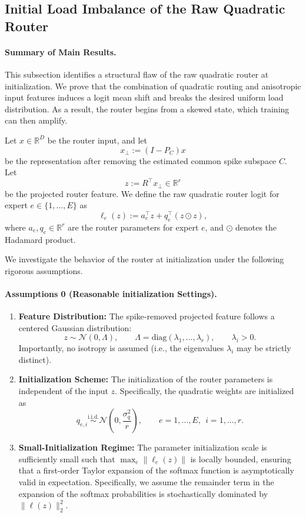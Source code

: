 \documentclass[11pt]{article}
\begin{document}
\subsection{Initial Load Imbalance of the Raw Quadratic Router}

\paragraph{Summary of Main Results.}
This subsection identifies a structural flaw of the raw quadratic router at initialization. We prove that the combination of quadratic routing and anisotropic input features induces a logit mean shift and breaks the desired uniform load distribution. As a result, the router begins from a skewed state, which training can then amplify.

Let $x \in \mathbb{R}^D$ be the router input, and let
$$x_\perp := (I-P_C)x$$
be the representation after removing the estimated common spike subspace $C$.
Let
$$z := R^\top x_\perp \in \mathbb{R}^r$$
be the projected router feature. We define the raw quadratic router logit for expert $e \in \{1,\dots,E\}$ as
$$\ell_e(z) := a_e^\top z + q_e^\top (z \odot z),$$
where $a_e, q_e \in \mathbb{R}^r$ are the router parameters for expert $e$, and $\odot$ denotes the Hadamard product.

We investigate the behavior of the router at initialization under the following rigorous assumptions.

\paragraph{Assumptions 0 (Reasonable initialization Settings).}
\begin{enumerate}
    \item[(A1)] \textbf{Feature Distribution:} The spike-removed projected feature follows a centered Gaussian distribution:
    $$z \sim \mathcal{N}(0,\Lambda), \qquad \Lambda = \mathrm{diag}(\lambda_1,\dots,\lambda_r), \qquad \lambda_i>0.$$
    Importantly, no isotropy is assumed (i.e., the eigenvalues $\lambda_i$ may be strictly distinct).

    \item[(A2)] \textbf{Initialization Scheme:} The initialization of the router parameters is independent of the input $z$. Specifically, the quadratic weights are initialized as
    $$q_{e,i} \overset{\mathrm{i.i.d.}}{\sim} \mathcal{N}\!\left(0,\frac{\sigma_q^2}{r}\right), \qquad e=1,\dots,E,\ \ i=1,\dots,r.$$

    \item[(A3)] \textbf{Small-Initialization Regime:} The parameter initialization scale is sufficiently small such that $\max_{e} \|\ell_e(z)\|$ is locally bounded, ensuring that a first-order Taylor expansion of the softmax function is asymptotically valid in expectation. Specifically, we assume the remainder term in the expansion of the softmax probabilities is stochastically dominated by $\| \ell(z) \|_2^2$.
\end{enumerate}
\end{document}

